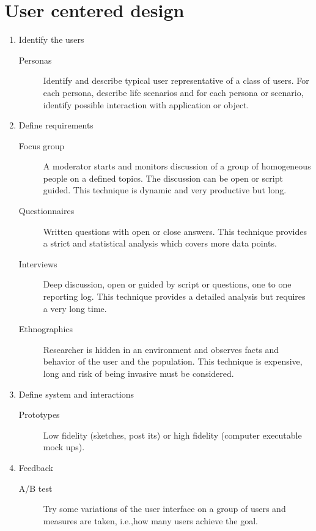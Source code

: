 \section{User centered design}
\begin{enumerate}
\item Identify the users
\begin{description}
\item [Personas] Identify and describe typical user representative of a class of users. For each persona, describe life scenarios and for each persona or scenario, identify possible interaction with application or object.
\end{description}

\item Define requirements
\begin{description}
\item [Focus group] A moderator starts and monitors discussion of a group of homogeneous people on a defined topics. The discussion can be open or script guided. This technique is dynamic and very productive but long.
\item [Questionnaires] Written questions with open or close answers. This technique provides a strict and statistical analysis which covers more data points.
\item [Interviews] Deep discussion, open or guided by script or questions, one to one reporting log. This technique provides a detailed analysis but requires a very long time.
\item [Ethnographics] Researcher is hidden in an environment and observes facts and behavior of the user and the population. This technique is expensive, long and risk of being invasive must be considered.
\end{description}

\item Define system and interactions
\begin{description}
\item [Prototypes] Low fidelity (sketches, post its) or high fidelity (computer executable mock ups). 
\end{description}

\item Feedback
\begin{description}
\item [A/B test] Try some variations of the user interface on a group of users and measures are taken, i.e.,\@ how many users achieve the goal. 
\end{description}
\end{enumerate}
